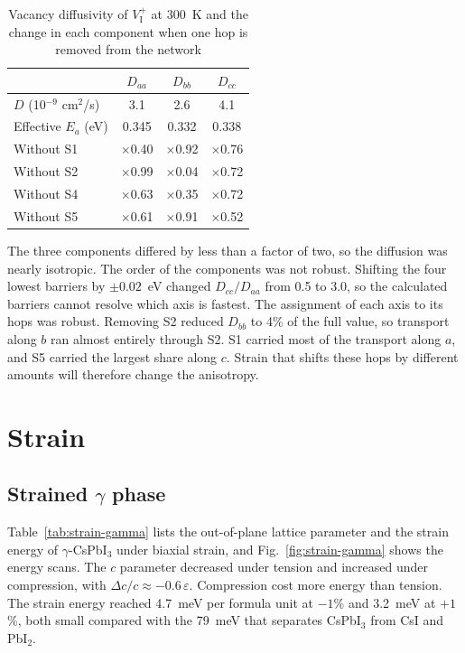 \begin{table}[htbp]
  \centering
  \caption{Vacancy diffusivity of $V_\mathrm{I}^{+}$ at 300~K and the change in each component when one hop is removed from the network}
  \label{tab:tensor}
  \begin{tabular}{lccc}
    \toprule
    & $D_{aa}$ & $D_{bb}$ & $D_{cc}$ \\
    \midrule
    $D$ (10$^{-9}$ cm$^2$/s) & 3.1 & 2.6 & 4.1 \\
    Effective $E_a$ (eV) & 0.345 & 0.332 & 0.338 \\
    \midrule
    Without S1 & $\times$0.40 & $\times$0.92 & $\times$0.76 \\
    Without S2 & $\times$0.99 & $\times$0.04 & $\times$0.72 \\
    Without S4 & $\times$0.63 & $\times$0.35 & $\times$0.72 \\
    Without S5 & $\times$0.61 & $\times$0.91 & $\times$0.52 \\
    \bottomrule
  \end{tabular}
\end{table}

The three components differed by less than a factor of two, so the diffusion was nearly isotropic. The order of the components was not robust. Shifting the four lowest barriers by $\pm0.02$~eV changed $D_{cc}/D_{aa}$ from 0.5 to 3.0, so the calculated barriers cannot resolve which axis is fastest. The assignment of each axis to its hops was robust. Removing S2 reduced $D_{bb}$ to 4\% of the full value, so transport along $b$ ran almost entirely through S2. S1 carried most of the transport along $a$, and S5 carried the largest share along $c$. Strain that shifts these hops by different amounts will therefore change the anisotropy.

\section{Strain}
\label{sec:res-strain}

\subsection{Strained $\gamma$ phase}

Table~\ref{tab:strain-gamma} lists the out-of-plane lattice parameter and the strain energy of $\gamma$-CsPbI$_3$ under biaxial strain, and Fig.~\ref{fig:strain-gamma} shows the energy scans. The $c$ parameter decreased under tension and increased under compression, with $\Delta c/c \approx -0.6\,\varepsilon$. Compression cost more energy than tension. The strain energy reached 4.7~meV per formula unit at $-1$\% and 3.2~meV at $+1$\%, both small compared with the 79~meV that separates CsPbI$_3$ from CsI and PbI$_2$.

